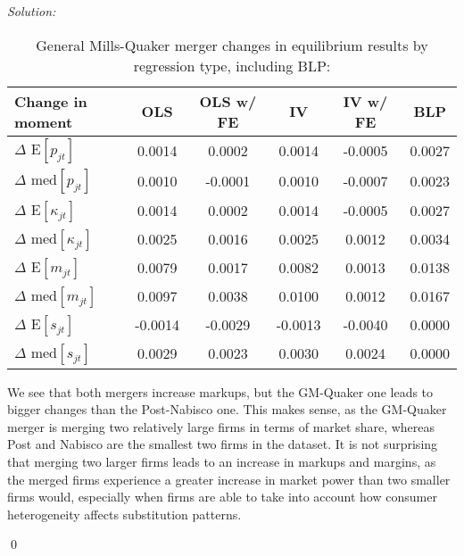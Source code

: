 \documentclass[12pt]{article}
\newenvironment{problem}[2][Problem]{\begin{trivlist}
\item[\hskip \labelsep {\bfseries #1}\hskip \labelsep {\bfseries #2.}]}{\end{trivlist}}
\newenvironment{sol}
    {\emph{Solution:}
    }
    {
    \qed
    }
\begin{document}
\begin{sol}
\begin{center}
    \begin{table}[htbp]
        \centering
        \caption{General Mills-Quaker merger changes in equilibrium results by regression type, including BLP:}
          \begin{tabular}{lccccc}
              \toprule
                Change in moment    & OLS          & OLS w/ FE & IV & IV w/ FE &BLP        \\
              \midrule
                $\Delta$ E$[p_{jt}]$       &0.0014 &0.0002 &0.0014 &-0.0005&0.0027\\
                $\Delta$ med$[p_{jt}]$      &0.0010 &-0.0001&0.0010 &-0.0007&0.0023\\
                \midrule
                $\Delta$ E$[\kappa_{jt}]$   &0.0014 &0.0002 &0.0014 &-0.0005&0.0027\\
                $\Delta$ med$[\kappa_{jt}]$ &0.0025 &0.0016 &0.0025 &0.0012&0.0034\\
                \midrule
                $\Delta$ E$[m_{jt}]$        &0.0079 &0.0017 &0.0082 &0.0013&0.0138\\
                $\Delta$ med$[m_{jt}]$      &0.0097 &0.0038 &0.0100 &0.0012&0.0167\\
                 \midrule
                $\Delta$  E$[s_{jt}]$      &-0.0014&-0.0029&-0.0013&-0.0040&0.0000\\
                $\Delta$ med$[s_{jt}]$     &0.0029 &0.0023 &0.0030 &0.0024&0.0000\\
              \bottomrule
          \end{tabular}
        \label{tab:gmq_merger_blp}
      \end{table}

\end{center}
We see that both mergers increase markups, but the GM-Quaker one leads to bigger changes than the Post-Nabisco one. This makes sense, as the GM-Quaker merger is merging two relatively large firms in terms of market share, whereas Post and Nabisco are the smallest two firms in the dataset. It is not surprising that merging two larger firms leads to an increase in markups and margins, as the merged firms experience a greater increase in market power than two smaller firms would, especially when firms are able to take into account how consumer heterogeneity affects substitution patterns.
\end{sol}
\begin{problem}{8}
\end{problem}
\end{document}
